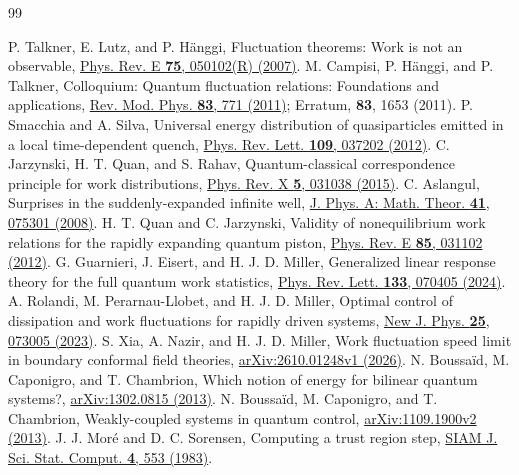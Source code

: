 \documentclass[aps,prl,reprint,superscriptaddress,longbibliography]{revtex4-2}
\begin{document}
\begin{thebibliography}{99}
\medskip

P. Talkner, E. Lutz, and P. H\"anggi,
Fluctuation theorems: Work is not an observable,
\href{https://doi.org/10.1103/PhysRevE.75.050102}{Phys. Rev. E \textbf{75}, 050102(R) (2007)}.
M. Campisi, P. H\"anggi, and P. Talkner,
Colloquium: Quantum fluctuation relations: Foundations and applications,
\href{https://doi.org/10.1103/RevModPhys.83.771}{Rev. Mod. Phys. \textbf{83}, 771 (2011)};
Erratum, \textbf{83}, 1653 (2011).
P. Smacchia and A. Silva,
Universal energy distribution of quasiparticles emitted in a local time-dependent quench,
\href{https://doi.org/10.1103/PhysRevLett.109.037202}{Phys. Rev. Lett. \textbf{109}, 037202 (2012)}.
C. Jarzynski, H. T. Quan, and S. Rahav,
Quantum-classical correspondence principle for work distributions,
\href{https://doi.org/10.1103/PhysRevX.5.031038}{Phys. Rev. X \textbf{5}, 031038 (2015)}.
C. Aslangul,
Surprises in the suddenly-expanded infinite well,
\href{https://doi.org/10.1088/1751-8113/41/7/075301}{J. Phys. A: Math. Theor. \textbf{41}, 075301 (2008)}.
H. T. Quan and C. Jarzynski,
Validity of nonequilibrium work relations for the rapidly expanding quantum piston,
\href{https://doi.org/10.1103/PhysRevE.85.031102}{Phys. Rev. E \textbf{85}, 031102 (2012)}.
G. Guarnieri, J. Eisert, and H. J. D. Miller,
Generalized linear response theory for the full quantum work statistics,
\href{https://doi.org/10.1103/PhysRevLett.133.070405}{Phys. Rev. Lett. \textbf{133}, 070405 (2024)}.
A. Rolandi, M. Perarnau-Llobet, and H. J. D. Miller,
Optimal control of dissipation and work fluctuations for rapidly driven systems,
\href{https://doi.org/10.1088/1367-2630/ace2e3}{New J. Phys. \textbf{25}, 073005 (2023)}.
S. Xia, A. Nazir, and H. J. D. Miller,
Work fluctuation speed limit in boundary conformal field theories,
\href{https://arxiv.org/abs/2610.01248}{arXiv:2610.01248v1 (2026)}.
N. Boussa\"id, M. Caponigro, and T. Chambrion,
Which notion of energy for bilinear quantum systems?,
\href{https://arxiv.org/abs/1302.0815}{arXiv:1302.0815 (2013)}.
N. Boussa\"id, M. Caponigro, and T. Chambrion,
Weakly-coupled systems in quantum control,
\href{https://arxiv.org/abs/1109.1900}{arXiv:1109.1900v2 (2013)}.
J. J. Mor\'e and D. C. Sorensen,
Computing a trust region step,
\href{https://doi.org/10.1137/0904038}{SIAM J. Sci. Stat. Comput. \textbf{4}, 553 (1983)}.

\end{thebibliography}
\end{document}
